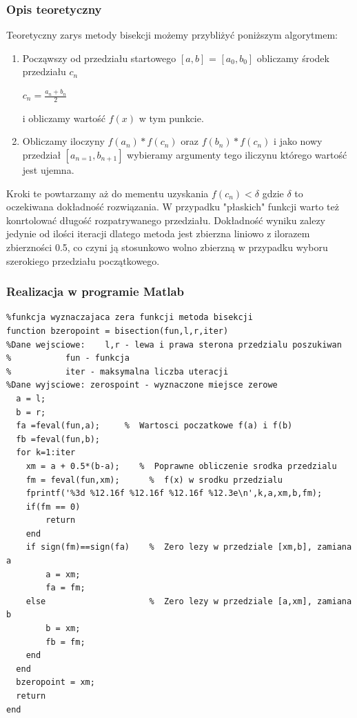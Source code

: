 \documentclass[a4paper, 11pt]{article}
\begin{document}
\subsubsection{Opis teoretyczny}
Teoretyczny zarys metody bisekcji możemy przybliżyć poniższym algorytmem:
\begin{enumerate}
  \item Począwszy od przedziału startowego $[a,b]$ = $[a_{0},b_{0}]$ obliczamy środek przedziału $c_{n}$\\
  	\begin{center}
  	$c_{n} = \frac{a_{n}+b_{n}}{2}$\\
	\end{center}
  i obliczamy wartość $f(x)$ w tym punkcie. 
  \item Obliczamy iloczyny $f(a_{n})*f(c_{n})$ oraz $f(b_{n})*f(c_{n})$ i jako nowy przedział $[a_{n=1},b_{n+1}]$
  wybieramy argumenty tego iliczynu którego wartość jest ujemna. 
\end{enumerate} 
Kroki te powtarzamy aż do mementu uzyskania $f(c_{n})<\delta$ gdzie $\delta$ to oczekiwana dokładność rozwiązania. W przypadku "płaskich"  funkcji warto też konrtolować długość rozpatrywanego przedziału. 
Dokładność wyniku zalezy jedynie od ilości iteracji dlatego metoda jest zbierzna liniowo z ilorazem zbierzności 0.5, co czyni ją stosunkowo wolno zbierzną w przypadku wyboru szerokiego przedziału początkowego. 



\subsubsection{Realizacja w programie Matlab}
\begin{lstlisting}
%funkcja wyznaczajaca zera funkcji metoda bisekcji
function bzeropoint = bisection(fun,l,r,iter)
%Dane wejsciowe:	l,r - lewa i prawa sterona przedzialu poszukiwan
%			fun - funkcja 
%			iter - maksymalna liczba uteracji
%Dane wyjsciowe: zerospoint - wyznaczone miejsce zerowe
  a = l; 
  b = r;
  fa =feval(fun,a);     %  Wartosci poczatkowe f(a) i f(b)
  fb =feval(fun,b);
  for k=1:iter
    xm = a + 0.5*(b-a);    %  Poprawne obliczenie srodka przedzialu
    fm = feval(fun,xm);      %  f(x) w srodku przedzialu
    fprintf('%3d %12.16f %12.16f %12.16f %12.3e\n',k,a,xm,b,fm);
    if(fm == 0)
        return
    end
    if sign(fm)==sign(fa)    %  Zero lezy w przedziale [xm,b], zamiana a
        a = xm;
        fa = fm;
    else                     %  Zero lezy w przedziale [a,xm], zamiana b
        b = xm;
        fb = fm;
    end
  end
  bzeropoint = xm; 
  return
end
\end{lstlisting}
\end{document}
